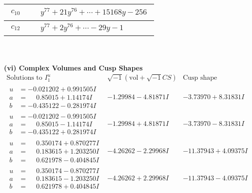 \documentclass[1p]{elsarticle_modified}
\theoremstyle{definition}
\newcommand{\I}{\sqrt{-1}}
\begin{document}
\begin{tabular}{m{50pt}|m{274pt}}
\hline $$\begin{aligned}c_{10}\end{aligned}$$&$\begin{aligned}
&y^{77}+21 y^{76}+\cdots+15168 y-256
\end{aligned}$\\
\hline $$\begin{aligned}c_{12}\end{aligned}$$&$\begin{aligned}
&y^{77}+2 y^{76}+\cdots-29 y-1
\end{aligned}$\\
\hline
\end{tabular}\\~\\
\newpage\flushleft \textbf{(vi) Complex Volumes and Cusp Shapes}
$$\begin{array}{c|c|c}  
\text{Solutions to }I^u_{1}& \I (\text{vol} + \sqrt{-1}CS) & \text{Cusp shape}\\
 \hline 
\begin{aligned}
u &= -0.021202 + 0.991505 I \\
a &= \phantom{-}0.85015 + 1.14174 I \\
b &= -0.435122 - 0.281974 I\end{aligned}
 & -1.29984 - 4.81871 I & -3.73970 + 8.31831 I \\ \hline\begin{aligned}
u &= -0.021202 - 0.991505 I \\
a &= \phantom{-}0.85015 - 1.14174 I \\
b &= -0.435122 + 0.281974 I\end{aligned}
 & -1.29984 + 4.81871 I & -3.73970 - 8.31831 I \\ \hline\begin{aligned}
u &= \phantom{-}0.350174 + 0.870277 I \\
a &= \phantom{-}0.183615 + 1.203250 I \\
b &= \phantom{-}0.621978 - 0.404845 I\end{aligned}
 & -4.26262 - 2.29968 I & -11.37943 + 4.09375 I \\ \hline\begin{aligned}
u &= \phantom{-}0.350174 - 0.870277 I \\
a &= \phantom{-}0.183615 - 1.203250 I \\
b &= \phantom{-}0.621978 + 0.404845 I\end{aligned}
 & -4.26262 + 2.29968 I & -11.37943 - 4.09375 I \\ \hline\begin{aligned}

\end{aligned}
\end{array}$$
\end{document}
